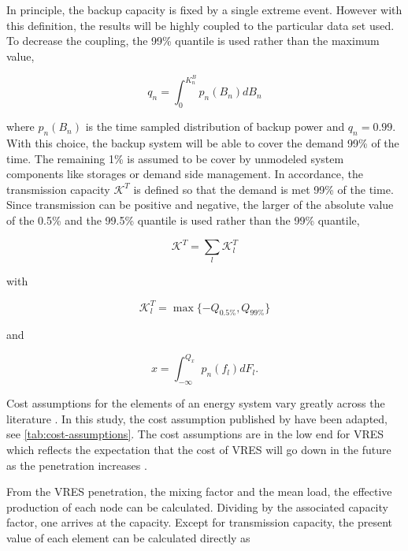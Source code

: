 \documentclass[a4paper, 5p, sort&compress]{elsarticle}%
\begin{document}
In principle, the backup capacity is fixed by a single extreme
event. However with this definition, the results will be highly
coupled to the particular data set used. To decrease the coupling, the
99\% quantile is used rather than the maximum value,

\begin{equation}
  \label{eq:2}
  q_{n} = \int _{0} ^{K_{n}^{B}} p_{n}(B_{n})dB_{n}
\end{equation}

where $p_{n}(B_{n})$ is the time sampled distribution of backup power
and $q_{n} = 0.99$. With this choice, the backup system will be able
to cover the demand 99\% of the time. The remaining 1\% is assumed to
be cover by unmodeled system components like storages or demand side
management. In accordance, the transmission capacity $\mathcal{K}^{T}$
is defined so that the demand is met 99\% of the time. Since
transmission can be positive and negative, the larger of the absolute
value of the 0.5\% and the 99.5\% quantile is used rather than the
99\% quantile,

\begin{equation}
  \label{eq:4}
  \mathcal{K}^{T} = \sum_{l} \mathcal{K}^{T}_{l} 
\end{equation}

with

\begin{equation}
  \label{eq:4}
  \mathcal{K}_{l}^{T} = \max \{-Q_{0.5\%} , Q_{99\%} \}
\end{equation}

and 

\begin{equation}
  \label{eq:4}
  x = \int_{-\infty}^{Q_{x}} p_{n}(f_{l}) dF_{l} .
\end{equation}

Cost assumptions for the elements of an energy system vary greatly
across the literature \cite{Sensitivity}. In this study, the cost assumption published by
\cite{Rolando} have been adapted, see \cref{tab:cost-assumptions}. The cost
assumptions are in the low end for VRES which reflects the expectation
that the cost of VRES will go down in the future as the penetration
increases \cite{Fraunhofer}.



From the VRES penetration, the mixing factor and the mean load, the
effective production of each node can be calculated. Dividing by the
associated capacity factor, one arrives at the capacity. Except for
transmission capacity, the present value of each element can be
calculated directly as
\end{document}
